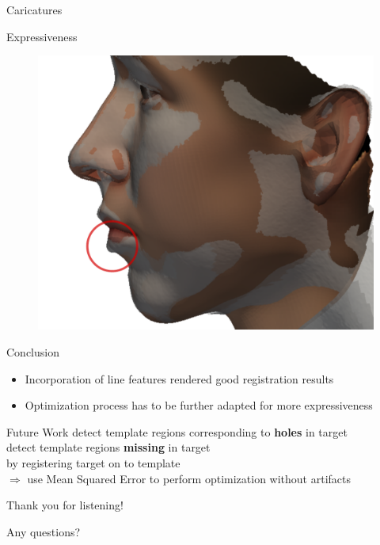 \documentclass[xcolor=x11names,compress]{beamer}
\begin{document}
\begin{frame}{Caricatures}
\end{frame}

\begin{frame}{Expressiveness}
    \begin{figure}
        \centering
        \includegraphics[width=.8\textwidth]{../resources/img/00041_expressiveness.pdf}
    \end{figure}
\end{frame}
\begin{frame}{Conclusion}
\begin{itemize}
\item Incorporation of line features rendered good registration results\\
\vfill  
\item Optimization process has to be further adapted for more expressiveness\\
\end{itemize}
\end{frame}

\begin{frame}{Future Work}
    detect template regions corresponding to \textbf{holes} in target\\
    detect template regions \textbf{missing} in target\\
    \bigskip
    by registering target on to template\\
    \vfill
    $\Rightarrow$ use Mean Squared Error to perform optimization without artifacts
\end{frame}
\begin{frame}{Thank you for listening!}
    \begin{center}
    \Large Any questions? 
    \end{center}
\end{frame}
\end{document}
